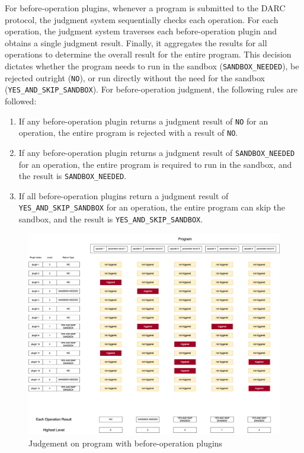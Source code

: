 \documentclass[main.tex]{subfiles}
\begin{document}
For before-operation plugins, whenever a program is submitted to the DARC protocol, the judgment system sequentially checks each operation. For each operation, the judgment system traverses each before-operation plugin and obtains a single judgment result. Finally, it aggregates the results for all operations to determine the overall result for the entire program. This decision dictates whether the program needs to run in the sandbox (\texttt{SANDBOX\_NEEDED}), be rejected outright (\texttt{NO}), or run directly without the need for the sandbox (\texttt{YES\_AND\_SKIP\_SANDBOX}). For before-operation judgment, the following rules are followed:

\begin{enumerate}
    \item If any before-operation plugin returns a judgment result of \texttt{NO} for an operation, the entire program is rejected with a result of \texttt{NO}.
    \item If any before-operation plugin returns a judgment result of \texttt{SANDBOX\_NEEDED} for an operation, the entire program is required to run in the sandbox, and the result is \texttt{SANDBOX\_NEEDED}.
    \item If all before-operation plugins return a judgment result of \texttt{YES\_AND\_SKIP\_SANDBOX} for an operation, the entire program can skip the sandbox, and the result is \texttt{YES\_AND\_SKIP\_SANDBOX}.
\end{enumerate}


\begin{figure}
\centering
\includegraphics[width=1\linewidth]{judgement_plugin_levels_before_ops.drawio.png}
\caption{\label{fig:judgement-before-op}Judgement on program with before-operation plugins}
\end{figure}
\end{document}
